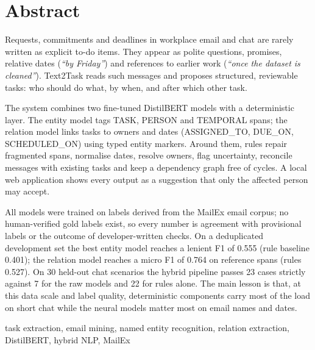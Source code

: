 \chapter*{Abstract}
Requests, commitments and deadlines in workplace email and chat are rarely written as explicit to-do items. They appear as polite questions, promises, relative dates (\emph{``by Friday''}) and references to earlier work (\emph{``once the dataset is cleaned''}). Text2Task reads such messages and proposes structured, reviewable tasks: who should do what, by when, and after which other task.

The system combines two fine-tuned DistilBERT models with a deterministic layer. The entity model tags TASK, PERSON and TEMPORAL spans; the relation model links tasks to owners and dates (ASSIGNED\_TO, DUE\_ON, SCHEDULED\_ON) using typed entity markers. Around them, rules repair fragmented spans, normalise dates, resolve owners, flag uncertainty, reconcile messages with existing tasks and keep a dependency graph free of cycles. A local web application shows every output as a suggestion that only the affected person may accept.

All models were trained on labels derived from the MailEx email corpus; no human-verified gold labels exist, so every number is agreement with provisional labels or the outcome of developer-written checks. On a deduplicated development set the best entity model reaches a lenient F1 of 0.555 (rule baseline 0.401); the relation model reaches a micro F1 of 0.764 on reference spans (rules 0.527). On 30 held-out chat scenarios the hybrid pipeline passes 23 cases strictly against 7 for the raw models and 22 for rules alone. The main lesson is that, at this data scale and label quality, deterministic components carry most of the load on short chat while the neural models matter most on email names and dates.
\vspace{1em}

 {\small task extraction, email mining, named entity recognition, relation extraction, DistilBERT, hybrid NLP, MailEx}

\tableofcontents

